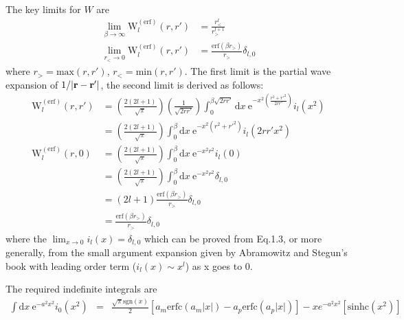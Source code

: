 \documentclass[paper=a4, fontsize=11pt]{article} %
\numberwithin{equation}{section} %
\numberwithin{figure}{section} %
\numberwithin{table}{section} %
\newcommand{\br}{{\bf{r}}}
\newcommand{\re}{{\mathrm{e}}}
\newcommand{\rerf}{{\mathrm{erf}}}
\newcommand{\rerfc}{{\mathrm{erfc}}}
\newcommand{\rd}{{\mathrm{d}}}
\newcommand{\PWerf}{\mathrm{W}^{(\mathrm{erf})}}
\newcommand{\sgn}{\mathrm{sgn}}
\newcommand{\sinhc}{\mathrm{sinhc}}
\newcommand{\rgt}{r_{>}}
\newcommand{\rlt}{r_{<}}
\begin{document}
The key limits for $W$ are 
\begin{equation}
\begin{split}
\lim_{\beta \rightarrow \infty}\PWerf_l(r,r')
&= \frac{\rlt^l}{\rgt^{l+1}} \\
\lim_{\rlt \rightarrow 0}\PWerf_l(r,r')
&= \frac{\rerf(\beta \rgt)}{\rgt}\delta_{l,0} 
\end{split}
\end{equation}
where $\rgt = \mathrm{max}(r,r')$, $\rlt = \mathrm{min}(r,r')$. The first limit is the partial wave expansion of $1/|\br-\br'|$, the second limit is derived as follows:
\begin{equation}
\begin{split}
\PWerf_l(r,r') &= \left(\frac{2(2l+1)}{\sqrt{\pi}}\right)\left(\frac{1}{\sqrt{2rr'}}\right) \int_0^{\beta\sqrt{2rr'}}\rd x\ \re^{-x^2\left(\frac{r^2 + r'^2}{2rr'}\right)}i_{l}(x^2)\\
&= \left(\frac{2(2l+1)}{\sqrt{\pi}}\right) \int_0^{\beta}\rd x\ \re^{-x^2\left(r^2 + r'^2\right)}i_{l}(2 rr' x^2)\\
\PWerf_l(r,0) 
&= \left(\frac{2(2l+1)}{\sqrt{\pi}}\right) \int_0^{\beta}\rd x\ \re^{-x^2 r^2 }i_{l}(0)\\
&= \left(\frac{2(2l+1)}{\sqrt{\pi}}\right) \int_0^{\beta}\rd x\ \re^{-x^2 r^2 }\delta_{l,0}\\
&= (2l+1) \frac{\rerf(\beta \rgt)}{\rgt}\delta_{l,0} \\
&= \frac{\rerf(\beta \rgt)}{\rgt}\delta_{l,0}
\end{split}
\end{equation}
where the $\lim_{x \rightarrow 0} i_l(x) = \delta_{l,0}$ which can be proved from Eq.1.3, or more generally, from the small argument expansion given by Abramowitz and Stegun's book with leading order term ($i_l(x) \sim x^l$) as x goes to 0. 

The required indefinite integrals are
\begin{eqnarray}
\int \rd x\ \re^{-a^2x^2}i_{0}(x^2)&=& 
\frac{\sqrt{\pi}\sgn(x)}{2}\left [a_m \rerfc(a_m |x|) - a_p \rerfc(a_p |x|) \right ] 
- xe^{-a^2x^2} \left [\sinhc(x^2)\right]
\end{eqnarray}
\end{document}
